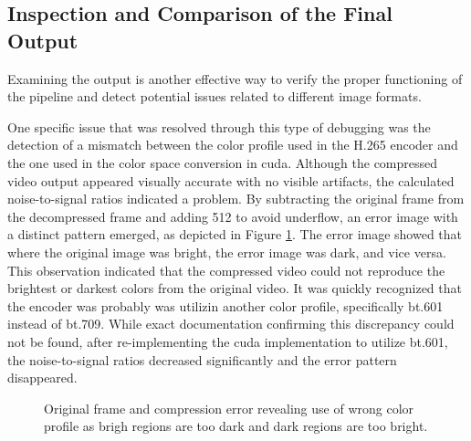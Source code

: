 \subsection{Inspection and Comparison of the Final Output}
\label{sec:inspection_and_comparison_of_the_final_output}
Examining the output is another effective way to verify the proper functioning of the pipeline and detect potential issues related to different image formats.

One specific issue that was resolved through this type of debugging was the detection of a mismatch between the color profile used in the H.265 encoder and the one used in the color space conversion in \gls{cuda}.
Although the compressed video output appeared visually accurate with no visible artifacts, the calculated noise-to-signal ratios indicated a problem.
By subtracting the original frame from the decompressed frame and adding 512 to avoid underflow, an error image with a distinct pattern emerged, as depicted in Figure \ref{fig:compression_error}.
The error image showed that where the original image was bright, the error image was dark, and vice versa.
This observation indicated that the compressed video could not reproduce the brightest or darkest colors from the original video.
It was quickly recognized that the encoder was probably was utilizin another color profile, specifically bt.601 instead of bt.709.
While exact documentation confirming this discrepancy could not be found, after re-implementing the \gls{cuda} implementation to utilize bt.601, the noise-to-signal ratios decreased significantly and the error pattern disappeared.

\begin{figure}
    \centering
    \caption{Original frame and compression error revealing use of wrong color profile as brigh regions are too dark and dark regions are too bright.}
    \label{fig:compression_error}
\end{figure}